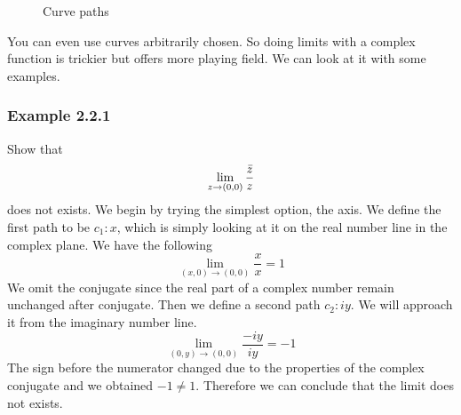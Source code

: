 \documentclass[12pt]{book}
\newcommand{\limto}[1]{\lim_{#1}}
\begin{document}
\begin{figure}[!h]
    \centering
\caption{Curve paths}
\label{fig:2.2}
\end{figure}

You can even use curves arbitrarily chosen. So doing limits with a complex function is trickier but offers more playing field. We can look at it with some examples.
\subsubsection{Example 2.2.1}
Show that \[
\limto{z \to (0,0)} \frac{\Bar{z}}{z}
\]
does not exists. We begin by trying the simplest option, the axis. We define the first path to be $c_1 \colon x$, which is simply looking at it on the real number line in the complex plane. We have the following
\[
\limto{(x,0)\to (0,0)}\frac{x}{x} = 1
\]
We omit the conjugate since the real part of a complex number remain unchanged after conjugate. Then we define a second path $c_2 \colon iy$. We will approach it from the imaginary number line. 
\[
\limto{(0,y)\to(0,0)} \frac{-iy}{iy} = -1
\]
The sign before the numerator changed due to the properties of the complex conjugate and we obtained $-1 \neq 1$. Therefore we can conclude that the limit does not exists.
\end{document}
